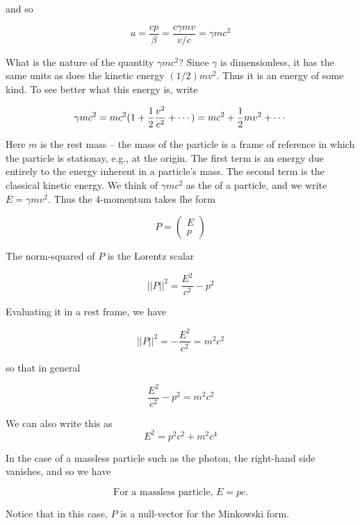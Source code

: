 and so

\begin{equation}
  a = \frac{cp}{\beta} = \frac{c\gamma mv}{v/c} = \gamma mc^2
\end{equation}

What is the nature of the quantity $\gamma mc^2$?
Since $\gamma$ is dimensionless, it has the same units
as does the kinetic energy $(1/2)mv^2$.  Thus it is an energy of
some kind. To see better what this energy is, write

\begin{equation}
\gamma m c^2 
=  mc^2(1 + \small{\frac{1}{2}} \frac{v^2 }{ c^2} + \cdots)
= mc^2 + \small{\frac{1}{2}} mv^2 + \cdots
\end{equation}

Here $m$ is the rest mass -- the mass of the particle is a frame
of reference in which the particle is stationay, e.g., at the origin.
The first term is an energy due entirely to the energy inherent 
in a particle's mass. The second term is the classical kinetic energy.
We think of $\gamma mc^2$ as the  of a particle, 
and we write $E = \gamma mv^2$.  Thus the 4-momentum 
takes fhe form

\begin{equation}
  P = \begin{pmatrix}E \\ p \end{pmatrix}
\end{equation}



The norm-squared of $P$ is the Lorentz scalar

\begin{equation}
  ||P||^2 = \frac{E^2 }{ c^2} - p^2
\end{equation}

Evaluating it in a rest frame, we have

\begin{equation}
  ||P||^2 = - \frac{E^2 }{ c^2}  = m^2 c^2
\end{equation}

so that in general

\begin{equation}
  \frac{E^2 }{ c^2} - p^2  = m^2 c^2
\end{equation}

We can also write this as
\begin{equation}
\label{relativistic_energy_momentum_equation}
E^2 = p^2 c^2 + m^2 c^4
\end{equation}

In the case of a massless particle such as the photon,
the right-hand side vanishes, and so we have

\begin{equation}
\label{energy_momentum_proportionality}
\text{For a massless particle,  }
 E = pc.
\end{equation}

Notice that in this case, $P$ is a null-vector for the Minkowski form.